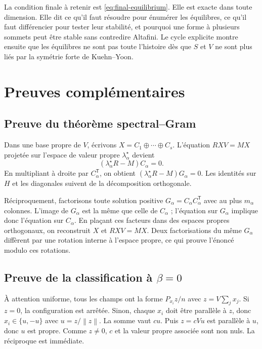 \documentclass[11pt,a4paper]{article}
\theoremstyle{definition}
\newcommand{\T}{\mathsf T}
\newcommand{\norm}[1]{\left\lVert #1\right\rVert}
\begin{document}
La condition finale à retenir est \eqref{eq:final-equilibrium}. Elle est exacte dans toute
dimension. Elle dit ce qu'il faut résoudre pour énumérer les équilibres, ce qu'il faut
différencier pour tester leur stabilité, et pourquoi une forme à plusieurs sommets peut
être stable sans contredire Altafini. Le cycle explicite montre ensuite que les équilibres
ne sont pas toute l'histoire dès que $S$ et $V$ ne sont plus liés par la symétrie forte de
Kuehn--Yoon.

\appendix

\section{Preuves complémentaires}
\label{app:proofs}

\subsection{Preuve du théorème spectral--Gram}

Dans une base propre de $V$, écrivons $X=C_1\oplus\cdots\oplus C_s$. L'équation
$RXV=MX$ projetée sur l'espace de valeur propre $\lambda_\alpha^\star$ devient
\[
 (\lambda_\alpha^\star R-M)C_\alpha=0.
\]
En multipliant à droite par $C_\alpha^{\T}$, on obtient
$(\lambda_\alpha^\star R-M)G_\alpha=0$. Les identités sur $H$ et les diagonales suivent
de la décomposition orthogonale.

Réciproquement, factorisons toute solution positive
$G_\alpha=C_\alpha C_\alpha^{\T}$ avec au plus $m_\alpha$ colonnes. L'image de
$G_\alpha$ est la même que celle de $C_\alpha$ ; l'équation sur $G_\alpha$ implique donc
l'équation sur $C_\alpha$. En plaçant ces facteurs dans des espaces propres orthogonaux,
on reconstruit $X$ et $RXV=MX$. Deux factorisations du même $G_\alpha$ diffèrent par une
rotation interne à l'espace propre, ce qui prouve l'énoncé modulo ces rotations.

\subsection{Preuve de la classification à \texorpdfstring{$\beta=0$}{bêta = 0}}

À attention uniforme, tous les champs ont la forme $P_{x_i}z/n$ avec
$z=V\sum_jx_j$. Si $z=0$, la configuration est arrêtée. Sinon, chaque $x_i$ doit être
parallèle à $z$, donc $x_i\in\{u,-u\}$ avec $u=z/\norm z$. La somme vaut $cu$. Puis
$z=cVu$ est parallèle à $u$, donc $u$ est propre. Comme $z\neq0$, $c$ et la valeur propre
associée sont non nuls. La réciproque est immédiate.
\end{document}
